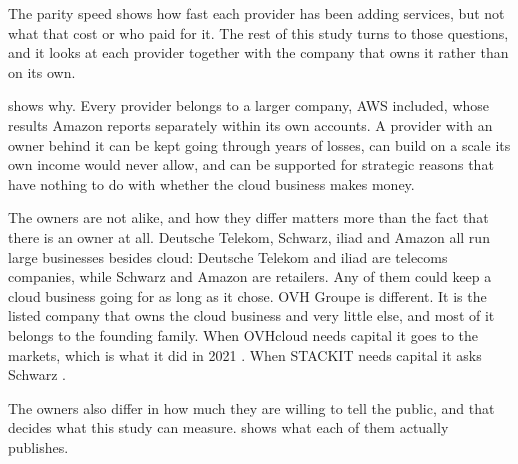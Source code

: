 The parity speed shows how fast each provider has been adding services, but not
what that cost or who paid for it. The rest of this study turns to those questions,
and it looks at each provider together with the company that owns it rather than on
its own.

 shows why. Every provider belongs to a larger company,
\acs{AWS} included, whose results Amazon reports separately within its own accounts.
A provider with an owner behind it can be kept going through years of losses, can
build on a scale its own income would never allow, and can be supported for
strategic reasons that have nothing to do with whether the cloud business makes
money.

The owners are not alike, and how they differ matters more than the fact that
there is an owner at all. Deutsche Telekom, Schwarz, iliad and Amazon all run large
businesses besides cloud: Deutsche Telekom and iliad are telecoms companies, while
Schwarz and Amazon are retailers. Any of them could keep a cloud business going
for as long as it chose. OVH Groupe is different. It is the listed company that owns
the cloud business and very little else, and most of it belongs to the founding
family. When OVHcloud needs capital it goes
to the markets, which is what it did in 2021 \cite{OVHcloud_IPO}. When STACKIT
needs capital it asks Schwarz \cite{SchwarzDigits_Luebbenau_2025}.


The owners also differ in how much they are willing to tell the public, and that
decides what this study can measure.  shows what each
of them actually publishes.

